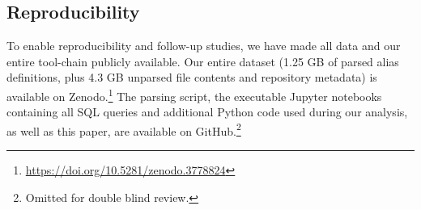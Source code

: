 

\subsection{Reproducibility}
\label{sec:reproducibility}

To enable reproducibility and follow-up studies, we have made all data and our entire tool-chain publicly available.
Our entire dataset (1.25 GB of parsed alias definitions, plus 4.3 GB unparsed file contents and repository metadata) is available on Zenodo.\footnote{\url{https://doi.org/10.5281/zenodo.3778824}}
The parsing script, the executable Jupyter notebooks containing all SQL queries and additional Python code used during our analysis, as well as this paper, are available on GitHub.\footnote{Omitted for double blind review.}
